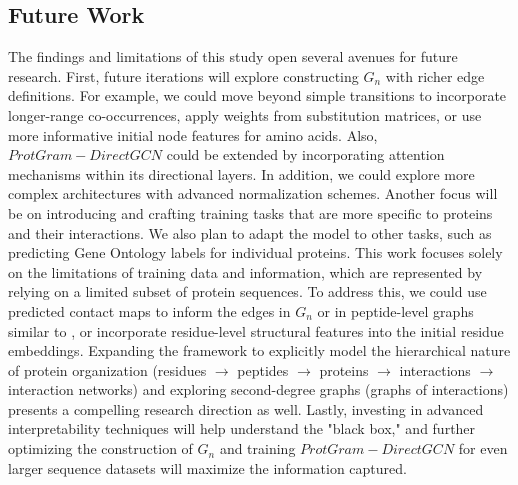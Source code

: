 \documentclass[utf8]{FrontiersinHarvard}
\begin{document}
	\subsection{Future Work}
The findings and limitations of this study open several avenues for future research. First, future iterations will explore constructing $G_{n}$ with richer edge definitions. For example, we could move beyond simple transitions to incorporate longer-range co-occurrences, apply weights from substitution matrices, or use more informative initial node features for amino acids. Also, $ProtGram-DirectGCN$ could be extended by incorporating attention mechanisms within its directional layers. In addition, we could explore more complex architectures with advanced normalization schemes. Another focus will be on introducing and crafting training tasks that are more specific to proteins and their interactions. We also plan to adapt the model to other tasks, such as predicting Gene Ontology labels for individual proteins. This work focuses solely on the limitations of training data and information, which are represented by relying on a limited subset of protein sequences. To address this, we could use predicted contact maps to inform the edges in $G_{n}$ or in peptide-level graphs similar to \cite{sledzieski_dscripttranslatesgenome_2021}, or incorporate residue-level structural features into the initial residue embeddings. Expanding the framework to explicitly model the hierarchical nature of protein organization (residues $\rightarrow$ peptides $\rightarrow$ proteins $\rightarrow$ interactions $\rightarrow$ interaction networks) and exploring second-degree graphs (graphs of interactions) presents a compelling research direction \cite{jeh_simrankmeasurestructuralcontext_2002} as well. Lastly, investing in advanced interpretability techniques will help understand the "black box," and further optimizing the construction of $G_{n}$ and training $ProtGram-DirectGCN$ for even larger sequence datasets will maximize the information captured.
	
\end{document}
